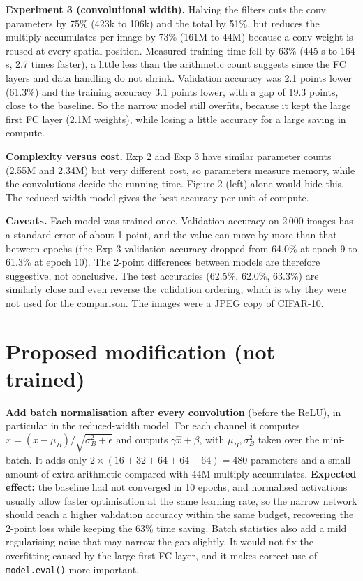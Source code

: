 \documentclass[10pt]{article}
\begin{document}
\textbf{Experiment 3 (convolutional width).} Halving the filters cuts the conv parameters by 75\% (423k to 106k) and the total by 51\%, but reduces the multiply-accumulates per image by 73\% (161M to 44M) because a conv weight is reused at every spatial position. Measured training time fell by 63\% (445 s to 164 s, 2.7 times faster), a little less than the arithmetic count suggests since the FC layers and data handling do not shrink. Validation accuracy was 2.1 points lower (61.3\%) and the training accuracy 3.1 points lower, with a gap of 19.3 points, close to the baseline. So the narrow model still overfits, because it kept the large first FC layer (2.1M weights), while losing a little accuracy for a large saving in compute.

\textbf{Complexity versus cost.} Exp 2 and Exp 3 have similar parameter counts (2.55M and 2.34M) but very different cost, so parameters measure memory, while the convolutions decide the running time. Figure 2 (left) alone would hide this. The reduced-width model gives the best accuracy per unit of compute.

\textbf{Caveats.} Each model was trained once. Validation accuracy on 2\,000 images has a standard error of about 1 point, and the value can move by more than that between epochs (the Exp 3 validation accuracy dropped from 64.0\% at epoch 9 to 61.3\% at epoch 10). The 2-point differences between models are therefore suggestive, not conclusive. The test accuracies (62.5\%, 62.0\%, 63.3\%) are similarly close and even reverse the validation ordering, which is why they were not used for the comparison. The images were a JPEG copy of CIFAR-10.

\section*{Proposed modification (not trained)}
\textbf{Add batch normalisation after every convolution} (before the ReLU), in particular in the reduced-width model. For each channel it computes $\hat x=(x-\mu_B)/\sqrt{\sigma_B^2+\epsilon}$ and outputs $\gamma\hat x+\beta$, with $\mu_B,\sigma_B^2$ taken over the mini-batch. It adds only $2\times(16+32+64+64+64)=480$ parameters and a small amount of extra arithmetic compared with 44M multiply-accumulates. \textbf{Expected effect:} the baseline had not converged in 10 epochs, and normalised activations usually allow faster optimisation at the same learning rate, so the narrow network should reach a higher validation accuracy within the same budget, recovering the 2-point loss while keeping the 63\% time saving. Batch statistics also add a mild regularising noise that may narrow the gap slightly. It would not fix the overfitting caused by the large first FC layer, and it makes correct use of \texttt{model.eval()} more important.
\end{document}

